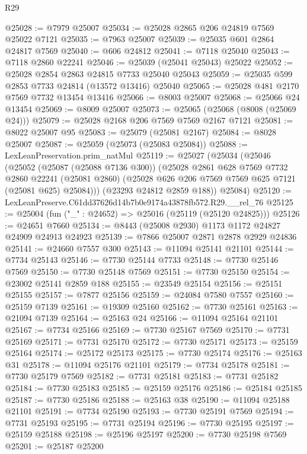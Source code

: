 \begin{lexlean}{R29}
\begin{coremodule}
@25028 := @7979 @25007
@25034 := @25028 @2865 @206 @24819 @7569 @25022 @7121
@25035 := @7963 @25007
@25039 := @25035 @601 @2864 @24817 @7569
@25040 := @606 @24812
@25041 := @7118 @25040
@25043 := @7118 @2860 @22241
@25046 := @25039 (@25041 @25043) @25022
@25052 := @25028 @2854 @2863 @24815 @7733 @25040 @25043
@25059 := @25035 @599 @2853 @7733 @24814 (@13572 @13416) @25040
@25065 := @25028 @481 @2170 @7569 @7732 @13454 @13416
@25066 := @8003 @25007
@25068 := @25066 @24 @13454
@25069 := @8009 @25007
@25073 := @25065 (@25068 (@8008 (@25069 @24)))
@25079 := @25028 @2168 @206 @7569 @7569 @2167 @7121
@25081 := @8022 @25007 @95
@25083 := @25079 (@25081 @2167)
@25084 := @8028 @25007
@25087 := @25059 (@25073 (@25083 @25084))
@25088 := LexLeanPreservation.prim_natMul
@25119 := @25027
    (@25034
      (@25046
        (@25052
          (@25087 (@25088 @7136 @300))
          (@25028
            @2861
            @628
            @7569
            @7732
            @2860
            @22241
            (@25081 @2860)
            (@25028 @626 @206 @7569 @7569 @625 @7121 (@25081 @625) @25084)))
        (@23293 @24812 @2859 @188))
      @25084)
@25120 := LexLeanPreserve.C61dd37626d14b7b0e9174a43878fb572.R29.__rel_76
@25125 := @25004 (fun ("_" : @24652) => @25016 (@25119 (@25120 @24825)))
@25126 := @24651 @7660
@25134 := @8443 (@25008 @2930) @1173 @1172 @24827 @24909 @24913 @24923
@25139 := @7866 @25007 @2871 @2878 @2929 @24836
@25141 := @24660 @7557 @300
@25143 := @11094 @25141 @21101
@25144 := @7734 @25143
@25146 := @7730 @25144 @7733
@25148 := @7730 @25146 @7569
@25150 := @7730 @25148 @7569
@25151 := @7730 @25150
@25154 := @23002 @25141 @2859 @188
@25155 := @23549 @25154
@25156 := @25151 @25155
@25157 := @7877 @25156
@25159 := @24084 @7580 @7557
@25160 := @25159 @7139
@25161 := @19309 @25160
@25162 := @7730 @25161
@25163 := @21094 @7139
@25164 := @25163 @24
@25166 := @11094 @25164 @21101
@25167 := @7734 @25166
@25169 := @7730 @25167 @7569
@25170 := @7731 @25169
@25171 := @7731 @25170
@25172 := @7730 @25171
@25173 := @25159 @25164
@25174 := @25172 @25173
@25175 := @7730 @25174
@25176 := @25163 @31
@25178 := @11094 @25176 @21101
@25179 := @7734 @25178
@25181 := @7730 @25179 @7569
@25182 := @7731 @25181
@25183 := @7731 @25182
@25184 := @7730 @25183
@25185 := @25159 @25176
@25186 := @25184 @25185
@25187 := @7730 @25186
@25188 := @25163 @38
@25190 := @11094 @25188 @21101
@25191 := @7734 @25190
@25193 := @7730 @25191 @7569
@25194 := @7731 @25193
@25195 := @7731 @25194
@25196 := @7730 @25195
@25197 := @25159 @25188
@25198 := @25196 @25197
@25200 := @7730 @25198 @7569
@25201 := @25187 @25200

\end{coremodule}
\end{lexlean}
